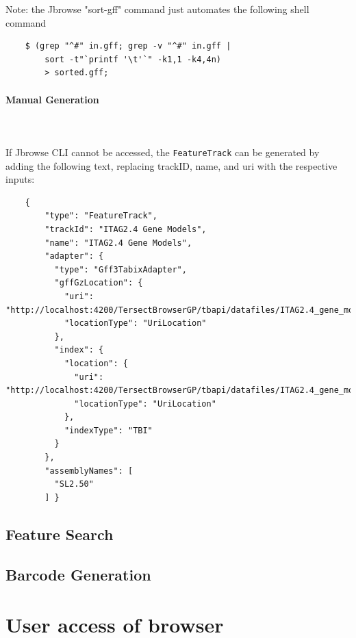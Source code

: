\documentclass[12pt]{article}
\begin{document}
Note: the Jbrowse "sort-gff" command just automates the following shell command 
\begin{lstlisting}
    $ (grep "^#" in.gff; grep -v "^#" in.gff | 
        sort -t"`printf '\t'`" -k1,1 -k4,4n)  
        > sorted.gff; 
\end{lstlisting}

\paragraph{Manual Generation}\mbox{}
\\\\
If Jbrowse CLI cannot be accessed, the \verb+FeatureTrack+ can be generated by adding the following text, replacing trackID, name, and uri with the respective inputs:
\begin{lstlisting}
    { 
        "type": "FeatureTrack", 
        "trackId": "ITAG2.4 Gene Models", 
        "name": "ITAG2.4 Gene Models", 
        "adapter": { 
          "type": "Gff3TabixAdapter", 
          "gffGzLocation": { 
            "uri": "http://localhost:4200/TersectBrowserGP/tbapi/datafiles/ITAG2.4_gene_models.sorted.gff3.gz", 
            "locationType": "UriLocation" 
          }, 
          "index": { 
            "location": { 
              "uri": "http://localhost:4200/TersectBrowserGP/tbapi/datafiles/ITAG2.4_gene_models.sorted.gff3.gz.tbi", 
              "locationType": "UriLocation" 
            }, 
            "indexType": "TBI" 
          } 
        }, 
        "assemblyNames": [ 
          "SL2.50" 
        ] } 
\end{lstlisting}

\subsection{Feature Search}



\subsection{Barcode Generation}


\section{User access of browser}
\end{document}
